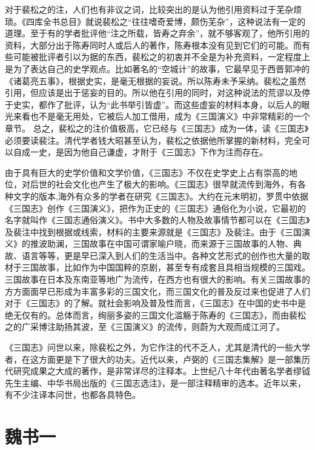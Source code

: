 \documentclass[12pt,UTF8]{ctexbook}
\begin{document}
对于裴松之的注，人们也有非议之词，比较突出的是认为他引用资料过于芜杂烦琐。《四库全书总目》就说裴松之“往往嗜奇爱博，颇伤芜杂”，这种说法有一定的道理。至于有的学者批评他“注之所载，皆寿之弃余”，就不够客观了，他所引用的资料，大部分出于陈寿同时人或后人的著作，陈寿根本没有见到它们的可能。而有些可能被批评者引以为据的东西，裴松之的初衷并不全是为补充资料，一定程度上是为了表达自己的史学观点。比如著名的“空城计”的故事，它最早见于西晋郭冲的《诸葛亮五事》，根据史实，是毫无根据的妄说。所以陈寿未予采纳。裴松之虽然引用，但应该是出于惩妄的目的。所以他在引用的同时，对这种说法的荒谬以及停于史实，都作了批评，认为“此书举引皆虚”。而这些虚妄的材料本身，以后人的眼光来看也不是毫无用处，它被后人加工借用，成为《三国演义》中非常精彩的一个章节。
总之，裴松之的注价值极高，它已经与《三国志》成为一体，读《三国志》必须要读裴注。清代学者钱大昭甚至认为，裴松之依据他所掌握的新材料，完全可以自成一史，是因为他自己谦虚，才附于《三国志》下作为注而存在。

由于具有巨大的史学价值和文学价值，《三国志》不仅在史学史上占有崇高的地位，对后世的社会文化也产生了极大的影响。《三国志》很早就流传到海外，有各种文字的版本,海外有众多的学者在研究《三国志》。大约在元末明初，罗贯中依据《三国志》创作《三国演义》，把作为正史的《三国志》通俗化为小说，它最初的名字就叫作《三国志通俗演义》。书中大多数的人物及故事情节都可以在《三国志》及裴注中找到根据或线索，材料的主要来源就是《三国志》及裴注。由于《三国演义》的推波助澜，三国故事在中国可谓家喻户晓，而来源于三国故事的人物、典故、语言等等，更是早已深入到人们的生活当中。各种文艺形式的创作也大量的取材于三国故事，比如作为中国国粹的京剧，甚至专有成套且具相当规模的三国戏。三国故事在日本及东南亚等地广为流传，在西方也有很大的影响。有关三国故事的方方面面早已形成为丰富多彩的三国文化，而三国文化的普及反过来也促进了人们对于《三国志》的了解。就社会影响及普及性而言，《三国志》在中国的史书中是绝无仅有的。总体而言，绚丽多姿的三国文化滥觞于陈寿的《三国志》，而由裴松之的广采博注助扬其波，至《三国演义》的流传，则蔚为大观而成江河了。

《三国志》问世以来，除裴松之外，为它作注的代不乏人，尤其是清代的一些大学者，在这方面更是下了很大的功夫。近代以来，卢弼的《三国志集解》是一部集历代研究成果之大成的著作，是非常详尽的注释本。上世纪八十年代由著名学者缪钺先生主编、中华书局出版的《三国志选注》，是一部注释精审的选本。近年以来，有不少注译本问世，也都各具特色。

\mainmatter

\part{魏书一}
\end{document}
